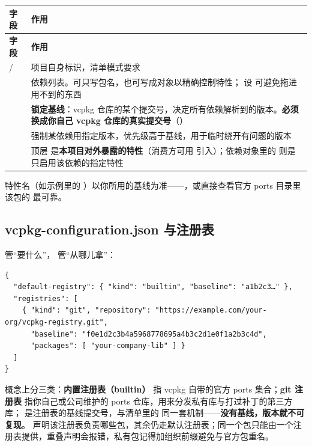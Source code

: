 \begin{longtable}{L{3.8cm}L{11.2cm}}
\toprule \textbf{字段} & \textbf{作用} \\ \midrule
\endfirsthead
\toprule \textbf{字段} & \textbf{作用} \\ \midrule
\endhead
\bottomrule \endlastfoot
{} /  & 项目自身标识，清单模式要求 \\
 & 依赖列表。可只写包名，也可写成对象以精确控制特性； 设  可避免拖进用不到的东西 \\
\allowbreak{} & \textbf{锁定基线}：vcpkg 仓库的某个提交号，决定所有依赖解析到的版本。\textbf{必须换成你自己 vcpkg 仓库的真实提交号}（） \\
 & 强制某依赖用指定版本，优先级高于基线，用于临时绕开有问题的版本 \\
 & 顶层  是\textbf{本项目对外暴露的特性}（消费方可用  引入）；依赖对象里的  则是只启用该依赖的指定特性 \\
\end{longtable}
\begin{tipbox}[提示]
特性名（如示例里的 ）以你所用的基线为准——，或直接查看官方 ports 目录里该包的  最可靠。
\end{tipbox}

\subsection{vcpkg-configuration.json 与注册表}
 管“要什么”， 管“从哪儿拿”：

\begin{lstlisting}[style=jsonstyle]
{
  "default-registry": { "kind": "builtin", "baseline": "a1b2c3…" },
  "registries": [
    { "kind": "git", "repository": "https://example.com/your-org/vcpkg-registry.git",
      "baseline": "f0e1d2c3b4a5968778695a4b3c2d1e0f1a2b3c4d",
      "packages": [ "your-company-lib" ] }
  ]
}
\end{lstlisting}

概念上分三类：\textbf{内置注册表（builtin）} 指 vcpkg 自带的官方 ports 集合；\textbf{git 注册表} 指你自己或公司维护的 ports 仓库，用来分发私有库与打过补丁的第三方库；\textbf{} 是注册表的基线提交号，与清单里的  同一套机制——\textbf{没有基线，版本就不可复现}。 声明该注册表负责哪些包，其余仍走默认注册表；同一个包只能由一个注册表提供，重叠声明会报错，私有包记得加组织前缀避免与官方包重名。

